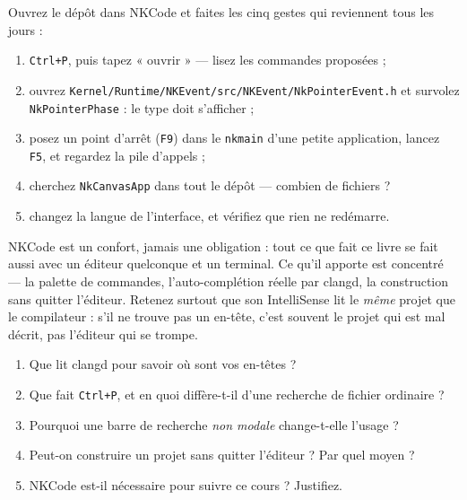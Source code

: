 \begin{nkpratique}
Ouvrez le dépôt dans NKCode et faites les cinq gestes qui reviennent tous les
jours :

\begin{enumerate}
\item \texttt{Ctrl+P}, puis tapez « ouvrir » --- lisez les commandes proposées ;
\item ouvrez \texttt{Kernel/Runtime/NKEvent/src/NKEvent/NkPointerEvent.h} et
      survolez \texttt{NkPointerPhase} : le type doit s'afficher ;
\item posez un point d'arrêt (\texttt{F9}) dans le \texttt{nkmain} d'une petite
      application, lancez \texttt{F5}, et regardez la pile d'appels ;
\item cherchez \texttt{NkCanvasApp} dans tout le dépôt --- combien de fichiers ?
\item changez la langue de l'interface, et vérifiez que rien ne redémarre.
\end{enumerate}
\end{nkpratique}

\begin{nkbilan}
NKCode est un confort, jamais une obligation : tout ce que fait ce livre se fait
aussi avec un éditeur quelconque et un terminal. Ce qu'il apporte est
concentré --- la palette de commandes, l'auto-complétion réelle par clangd, la
construction sans quitter l'éditeur. Retenez surtout que son IntelliSense lit le
\emph{même} projet que le compilateur : s'il ne trouve pas un en-tête, c'est
souvent le projet qui est mal décrit, pas l'éditeur qui se trompe.
\end{nkbilan}

\begin{nkquestions}
\begin{enumerate}
\item Que lit clangd pour savoir où sont vos en-têtes ?
\item Que fait \texttt{Ctrl+P}, et en quoi diffère-t-il d'une recherche de
      fichier ordinaire ?
\item Pourquoi une barre de recherche \emph{non modale} change-t-elle l'usage ?
\item Peut-on construire un projet sans quitter l'éditeur ? Par quel moyen ?
\item NKCode est-il nécessaire pour suivre ce cours ? Justifiez.
\end{enumerate}
\end{nkquestions}

